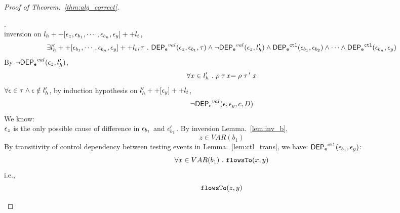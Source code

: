 \documentclass[a4paper,11pt]{article}
\begin{document}
\begin{proof}[Proof of Theorem.~\ref{thm:alg_correct}]
\begin{case}
%
\begin{subcase}.
\\
inversion on  $l_h ++ {[\mathtt{\epsilon}_z,  \mathtt{\epsilon}_{b_1}, \cdots, \mathtt{\epsilon}_{b_n},\mathtt{\epsilon}_y]} ++ l_t$, 
\[
  \exists l_{h}' ++ [ \mathtt{\epsilon}_{b_1}, \cdots, \mathtt{\epsilon}_{b_n}, \mathtt{\epsilon}_y] ++ l_t, \mathtt{\tau} ~.~
  \mathsf{DEP_{\mathtt{e}}}^{val}(\mathtt{\epsilon}_z, \mathtt{\epsilon}_{b_1}, \mathtt{\tau})
  \land 
  \neg \mathsf{DEP_{\mathtt{e}}}^{val} (\mathtt{\epsilon}_z, l_h')
  \land 
  \mathsf{DEP_{\mathtt{e}}}^{\mathtt{{ctl}}} (\mathtt{\epsilon}_{b_1}, \mathtt{\epsilon}_{b_2})
  \land 
  \cdots
  \land 
  \mathsf{DEP_{\mathtt{e}}}^{\mathtt{{ctl}}} (\mathtt{\epsilon}_{b_n}, \mathtt{\epsilon}_y)
\]
%
By $\neg \mathsf{DEP_{\mathtt{e}}}^{val} (\mathtt{\epsilon}_z, l_h')$, 
\[
  \forall x \in l_h' ~.~
  \rho \mathrel{ {\mathtt{\tau}} \, {x} } = \rho \mathrel{ {\mathtt{\tau}} \, {'} } x
\]
%
$\forall \mathtt{\epsilon} \in \mathtt{\tau} \land \mathtt{\epsilon} \notin l_h'$, by induction hypothesis on $l_{h}' ++ [\mathtt{\epsilon}_y] ++ l_t$, 
\[
  \neg \mathsf{DEP_{\mathtt{e}}}^{val} (\mathtt{\epsilon}, \mathtt{\epsilon}_y, c, D)
\]
%
We know:
\\
%
$\mathtt{\epsilon}_z$ is the only possible cause of difference in $\mathtt{\epsilon}_{b_1}$ and $\mathtt{\epsilon}_{b_1}'$.
%
By inversion Lemma.~\ref{lem:inv_b}, 
\[
  z \in VAR(b_1)
\]
%
%
By transitivity of control dependency between testing events in Lemma.~\ref{lem:ctl_trans},
we have:
 $ \mathsf{DEP_{\mathtt{e}}}^{\mathtt{{ctl}}} (\mathtt{\epsilon}_{b_1}, \mathtt{\epsilon}_y)$:
\[
  \forall x \in VAR(b_1) ~.~ \mathtt{flowsTo}(x, y)
\]
i.e.,
\[
  \mathtt{flowsTo}(z, y)
\]
%
\end{subcase}
%
\end{case}
%
\end{proof}
\end{document}
